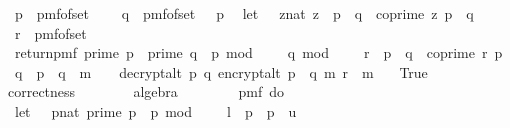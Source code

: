\begin{isabellebody}
\ \ p\ {\isasymleftarrow}\ pmf{\isacharunderscore}{\kern0pt}of{\isacharunderscore}{\kern0pt}set\ {\isasymK}{\isacharsemicolon}{\kern0pt}\ \isanewline
\ \ q\ {\isasymleftarrow}\ pmf{\isacharunderscore}{\kern0pt}of{\isacharunderscore}{\kern0pt}set\ {\isacharparenleft}{\kern0pt}{\isasymK}\ {\isacharminus}{\kern0pt}\ {\isacharbraceleft}{\kern0pt}p{\isacharbraceright}{\kern0pt}{\isacharparenright}{\kern0pt}{\isacharsemicolon}{\kern0pt}\isanewline
\ \ let\ {\isasymZ}\ {\isacharequal}{\kern0pt}\ {\isacharbraceleft}{\kern0pt}{\isacharparenleft}{\kern0pt}z{\isacharcolon}{\kern0pt}{\isacharcolon}{\kern0pt}nat{\isacharparenright}{\kern0pt}{\isachardot}{\kern0pt}\ z\ {\isacharless}{\kern0pt}\ p\ {\isacharasterisk}{\kern0pt}\ q\ {\isasymand}\ coprime\ z\ {\isacharparenleft}{\kern0pt}p\ {\isacharasterisk}{\kern0pt}\ q{\isacharparenright}{\kern0pt}{\isacharbraceright}{\kern0pt}{\isacharsemicolon}{\kern0pt}\isanewline
\ \ r\ {\isasymleftarrow}\ pmf{\isacharunderscore}{\kern0pt}of{\isacharunderscore}{\kern0pt}set\ {\isasymZ}{\isacharsemicolon}{\kern0pt}\isanewline
\ \ return{\isacharunderscore}{\kern0pt}pmf\ {\isacharparenleft}{\kern0pt}{\isacharparenleft}{\kern0pt}{\isasymnot}{\isacharparenleft}{\kern0pt}prime\ p\ {\isasymand}\ prime\ q\ {\isasymand}\ p\ mod\ {}\ {\isacharequal}{\kern0pt}\ {}\ {\isasymand}\ q\ mod\ {}\ {\isacharequal}{\kern0pt}\ {}\ {\isasymand}\ r\ {\isacharless}{\kern0pt}\ p\ {\isacharasterisk}{\kern0pt}\ q\ {\isasymand}\ coprime\ r\ {\isacharparenleft}{\kern0pt}p\ {\isacharasterisk}{\kern0pt}\ q{\isacharparenright}{\kern0pt}\ {\isasymand}\ p\ {\isasymnoteq}\ q\ {\isasymand}\ m\ {\isasymnoteq}\ {\isacharbrackleft}{\kern0pt}{\isacharbrackright}{\kern0pt}{\isacharparenright}{\kern0pt}\ {\isasymlongrightarrow}\ decrypt{\isacharunderscore}{\kern0pt}alt\ p\ q\ {\isacharparenleft}{\kern0pt}encrypt{\isacharunderscore}{\kern0pt}alt\ {\isacharparenleft}{\kern0pt}p\ {\isacharasterisk}{\kern0pt}\ q{\isacharparenright}{\kern0pt}\ m\ r{\isacharparenright}{\kern0pt}\ {\isacharequal}{\kern0pt}\ m{\isacharparenright}{\kern0pt}{\isacharparenright}{\kern0pt}{\isacharbraceright}{\kern0pt}{\isacharparenright}{\kern0pt}\ \isanewline
\ \ True{\isachardoublequoteclose}\isanewline
\ \ \ \ \isamarkupfalse%
\ correctness\ \ \isanewline
\ \ \ \ \isamarkupfalse%
\ algebra\isanewline
\isanewline
\ \ \isamarkupfalse%
\ \isamarkupfalse%
\ {\isachardoublequoteopen}\isanewline
\ \ pmf\ {\isacharparenleft}{\kern0pt}do\ {\isacharbraceleft}{\kern0pt}\isanewline
\ \ let\ {\isasymK}\ {\isacharequal}{\kern0pt}\ {\isacharbraceleft}{\kern0pt}{\isacharparenleft}{\kern0pt}p{\isacharcolon}{\kern0pt}{\isacharcolon}{\kern0pt}nat{\isacharparenright}{\kern0pt}{\isachardot}{\kern0pt}\ prime\ p\ {\isasymand}\ p\ mod\ {}\ {\isacharequal}{\kern0pt}\ {}\ {\isasymand}\ l\ {\isasymle}\ p\ {\isasymand}\ p\ {\isasymle}\ u{\isacharbraceright}{\kern0pt}{\isacharsemicolon}{\kern0pt}\isanewline

\end{isabellebody}
